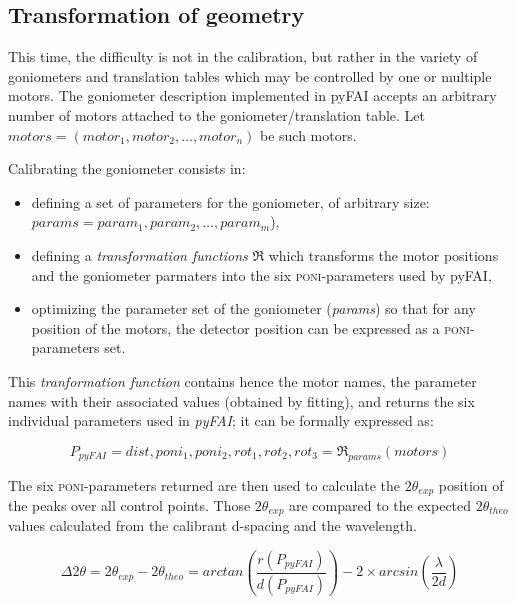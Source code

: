 \documentclass[preprint, pdf]{iucr}              %
\begin{document}
\subsection{Transformation of geometry}

This time, the difficulty is not in the calibration, but  rather in the
variety of goniometers and translation tables which may be controlled by one or multiple
motors.
The goniometer description implemented in pyFAI accepts an
arbitrary number of motors attached to the goniometer/translation table. 
Let $motors = (motor_1, motor_2, \ldots, motor_n)$ be such motors. 

Calibrating the goniometer consists in:
\begin{itemize}
  \item defining a set of parameters for the goniometer, of arbitrary size:
  $params = param_1, param_2, \ldots, param_m$),
  \item defining a \textit{transformation functions} $\Re$ which transforms the motor positions
  and the goniometer parmaters into the six \textsc{poni}-parameters used by
  pyFAI,
  \item optimizing the parameter set of the goniometer (\textit{params}) so that
  for any position of the motors, the detector position can be expressed as
  a \textsc{poni}-parameters set.
\end{itemize}

This \textit{tranformation function} contains hence the motor names, the
parameter names with their associated values (obtained by fitting), and returns
the six individual parameters used in \textit{pyFAI}; it can be formally
expressed as:

\begin{equation}
P_{pyFAI} = dist, poni_1, poni_2, rot_1, rot_2, rot_3 = \Re_{params}(motors)
\end{equation}


The six \textsc{poni}-parameters returned 
are then used to
calculate the $2\theta_{exp}$ position of the peaks over all control
points.
Those $2\theta_{exp}$ are compared to
the expected $2\theta_{theo}$ values calculated from the calibrant d-spacing and
the wavelength.

$$
\Delta 2\theta = 2\theta _{exp} - 2\theta _{theo} =
arctan(\frac{r(P_{pyFAI})}{d(P_{pyFAI})}) -  2 \times
arcsin(\frac{\lambda}{2d})
$$
\end{document}
